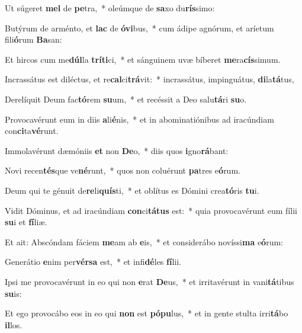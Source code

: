 \item Ut súgeret \textbf{mel} de \textbf{pe}tra,~* oleúmque de \textbf{sa}xo du\textbf{rís}simo:
\item Butýrum de arménto, et \textbf{lac} de \textbf{ó}\textbf{vi}bus,~* cum ádipe agnórum, et aríetum fili\textbf{ó}rum \textbf{Ba}san:
\item Et hircos cum me\textbf{dúl}la \textbf{trí}\textbf{ti}ci,~* et sánguinem uvæ bíberet \textbf{me}ra\textbf{cís}simum.
\item Incrassátus est diléctus, et re\textbf{cal}ci\textbf{trá}vit:~* incrassátus, impinguátus, \textbf{di}la\textbf{tá}tus,
\item Derelíquit Deum fac\textbf{tó}rem \textbf{su}um,~* et recéssit a Deo salu\textbf{tá}ri \textbf{su}o.
\item Provocavérunt eum in diis \textbf{a}li\textbf{é}nis,~* et in abominatiónibus ad iracúndiam con\textbf{ci}ta\textbf{vé}runt.
\item Immolavérunt dæmóniis \textbf{et} non \textbf{De}o,~* diis quos \textbf{i}gno\textbf{rá}bant:
\item Novi recen\textbf{tés}que ve\textbf{né}runt,~* quos non coluérunt \textbf{pa}tres e\textbf{ó}rum.
\item Deum qui te génuit de\textbf{re}li\textbf{quís}ti,~* et oblítus es Dómini crea\textbf{tó}ris \textbf{tu}i.
\item Vidit Dóminus, et ad iracúndiam \textbf{con}ci\textbf{tá}\textbf{tus} est:~* quia provocavérunt eum fílii \textbf{su}i et \textbf{fí}liæ.
\item Et ait: Abscóndam fáciem \textbf{me}am ab \textbf{e}is,~* et considerábo novíssi\textbf{ma} e\textbf{ó}rum:
\item Generátio \textbf{e}nim per\textbf{vér}\textbf{sa} est,~* et infi\textbf{dé}les \textbf{fí}lii.
\item Ipsi me provocavérunt in eo qui non \textbf{e}rat \textbf{De}us,~* et irritavérunt in vani\textbf{tá}tibus \textbf{su}is:
\item Et ego provocábo eos in eo qui \textbf{non} est \textbf{pó}\textbf{pu}lus,~* et in gente stulta irri\textbf{tá}bo \textbf{il}los.
